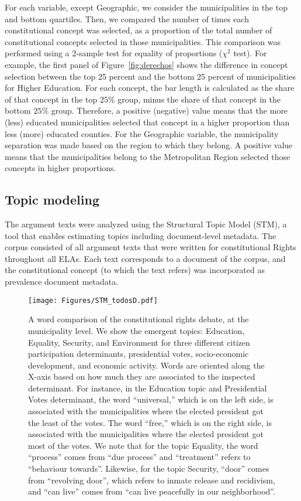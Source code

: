 \documentclass[onecolumn]{article}
\begin{document}
For each variable, except Geographic, we consider the municipalities in the top and bottom quartiles. Then, we compared the number of times each constitutional concept was selected, as a proportion of the total number of constitutional concepts selected in those municipalities. This comparison was performed using a 2-sample test for equality of proportions ($\chi ^2$ test). For example, the first panel of Figure~\ref{fig:derechos} shows the difference in concept selection between the top 25 percent and the bottom 25 percent of municipalities for Higher Education. For each concept, the bar length is calculated as the share of that concept in the top $25\%$ group, minus the share of that concept in the bottom $25\%$ group. Therefore, a positive (negative) value means that the more (less) educated municipalities selected that concept in a higher proportion than less (more) educated counties. For the Geographic variable, the municipality separation was made based on the region to which they belong. A positive value means that the municipalities belong to the Metropolitan Region selected those concepts in higher proportions.


\subsection*{Topic modeling}

The argument texts were analyzed using the Structural Topic Model (STM), a tool that enables estimating topics including document-level metadata. The corpus consisted of all argument texts that were written for constitutional Rights throughout all ELAs. Each text corresponds to a document of the corpus, and the constitutional concept (to which the text refers) was incorporated as prevalence document metadata. 



%

\begin{figure}[t!]
    \centering
    \texttt{[image: Figures/STM\_todosD.pdf]}
    \caption{A word comparison of the constitutional rights debate, at the municipality level. We show the emergent topics: Education, Equality, Security, and Environment for three different citizen participation determinants, presidential votes, socio-economic development, and economic activity. Words are oriented along the X-axis based on how much they are associated to the inspected determinant. For instance, in the Education topic and Presidential Votes determinant, the word ``universal,'' which is on the left side, is associated with the municipalities where the elected president got the least of the votes. The word ``free,'' which is on the right side, is associated with the municipalities where the elected president got most of the votes. We note that for the topic Equality,  the word ``process'' comes from ``due process'' and ``treatment'' refers to ``behaviour towards''. Likewise, for the topic Security, ``door'' comes from ``revolving door'', which refers to inmate release and recidivism, and  ``can live'' comes from ``can live peacefully in our neighborhood''. }
    \label{fig:fit2}
\end{figure}
\end{document}
